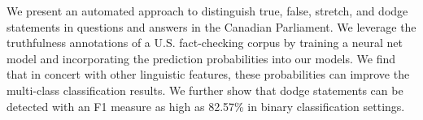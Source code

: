 We present an automated approach to distinguish true, false, stretch, and dodge statements in questions and answers in the Canadian Parliament. We leverage the truthfulness annotations of a U.S. fact-checking corpus by training a neural net model and incorporating the prediction probabilities into our models. We find that in concert with other linguistic features, these probabilities can improve the multi-class classification results. We further show that dodge statements can be detected with an F1 measure as high as 82.57\% in binary classification settings.
